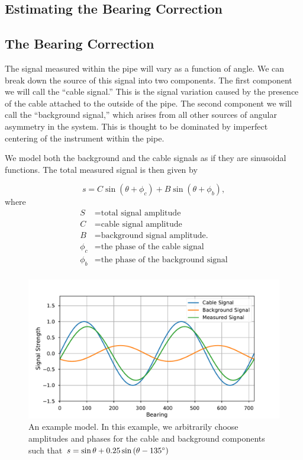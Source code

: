 \documentclass[paper=a4, fontsize=11pt]{scrartcl}
\numberwithin{equation}{section}		%
\numberwithin{figure}{section}			%
\numberwithin{table}{section}				%
\begin{document}
\begin{appendices}

\section{Estimating the Bearing Correction}
\subsection{The Bearing Correction}
The signal measured within the pipe will vary as a function of angle.  We can break down the source of this signal into two components.  The first component we will call the ``cable signal.''  This is the signal variation caused by the presence of the cable attached to the outside of the pipe.  The second component we will call the ``background signal,'' which arises from all other sources of angular asymmetry in the system.  This is thought to be dominated by imperfect centering of the instrument within the pipe.

\par We model both the background and the cable signals as if they are sinusoidal functions. The total measured signal is then given by

\begin{equation} \label{eq:trig_sig}
    s = C \sin\left(\theta + \phi_c\right) + B \sin\left(\theta + \phi_b\right),
\end{equation}
where
\begin{align*}
        S &= \text{total signal amplitude} \\
        C &= \text{cable signal amplitude} \\
        B &= \text{background signal amplitude.} \\
        \phi_c &= \text{the phase of the cable signal}\\
        \phi_b &= \text{the phase of the background signal}\\
\end{align*}


\begin{figure}[H]
  \caption{An example model.  In this example, we arbitrarily choose amplitudes and phases for the cable and background components such that  $s = \sin\theta + 0.25 \sin\left(\theta -135\degree\right)$
  }
  \label{fig:sigs_vs_bearing}
  \centering
  \includegraphics[width=1.0\textwidth]{figures/sigs_vs_bearing.pdf}
\end{figure}


\end{appendices}
\end{document}
